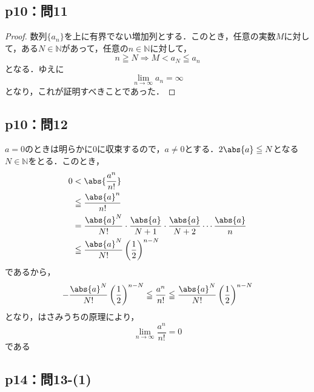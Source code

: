 \documentclass[uplatex,dvipdfmx,a4paper,10pt,fleqn]{jsarticle}
\begin{document}
    \subsection*{p10：問11}

    \begin{tleftbar}
        \begin{proof}
        数列$\{ a_n \}$を上に有界でない増加列とする．このとき，任意の実数$M$に対して，ある$N \in \mathbb{N}$があって，任意の$n \in \mathbb{N}$に対して，
        \[
            n \geqq N \Longrightarrow  M < a_N \leqq a_n
        \]
        となる．ゆえに
        \[
            \lim_{n \to \infty} a_n=\infty
        \]
        となり，これが証明すべきことであった．
        \end{proof}
    \end{tleftbar}
    
         
        \subsection*{p10：問12}

\begin{tleftbar}
    $a=0$のときは明らかに$0$に収束するので，$a \ne 0$とする．$2\abs{a} \leqq N$となる$N \in \mathbb{N}$をとる．このとき，
    \begin{align*}
         0 &< \abs{ \frac{a^n}{n!} } \\
         &\leqq \frac{\abs{a}^n}{n!} \\
         &= \frac{\abs{a}^{N}}{N!} \cdot \frac{\abs{a}}{N+1} \cdot \frac{\abs{a}}{N+2} \dotsm \frac{\abs{a}}{n} \\
         & \leqq  \frac{\abs{a}^{N}}{N!} \left(\frac{1}{2} \right)^{n-N}
    \end{align*}
    であるから，
    \[
        - \frac{\abs{a}^{N}}{N!} \left(\frac{1}{2} \right)^{n-N} \leqq  \frac{a^n}{n!} \leqq \frac{\abs{a}^{N}}{N!} \left(\frac{1}{2} \right)^{n-N}
    \]
    となり，はさみうちの原理により，
    \[
        \lim_{n \to \infty} \frac{a^n}{n!} =0
    \]
    である
\end{tleftbar}

\newpage


\subsection*{p14：問13-(1)}
\end{document}
